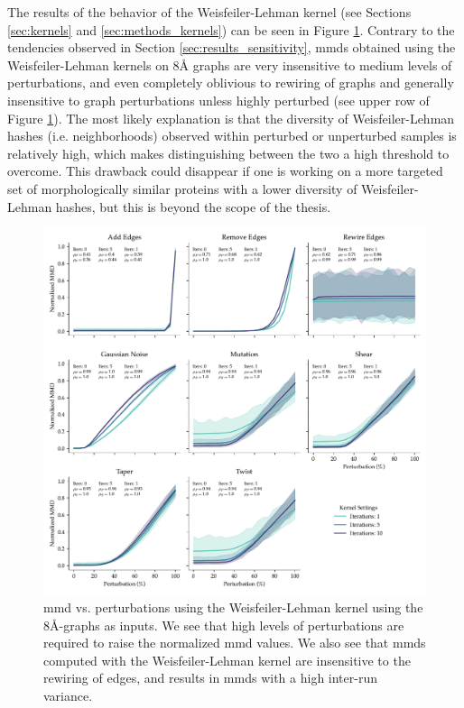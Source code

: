 The results of the behavior of the Weisfeiler-Lehman kernel (see Sections
\ref{sec:kernels} and \ref{sec:methods_kernels}) can be seen in Figure
\ref{fig:wlk}. Contrary to the tendencies observed in Section
\ref{sec:results_sensitivity}, \acrshort{mmd}s obtained using the Weisfeiler-Lehman
kernels on 8\si{\angstrom} graphs are very insensitive to medium levels of perturbations,
and even completely oblivious to rewiring of graphs and generally insensitive to
graph perturbations unless highly perturbed (see upper row of Figure \ref{fig:wlk}). The most likely explanation
is that the diversity of Weisfeiler-Lehman hashes (i.e. neighborhoods) observed within perturbed or
unperturbed samples is relatively high, which makes distinguishing between the
two a high threshold to overcome. This drawback could disappear if one is working on
a more targeted set of morphologically similar proteins with a lower diversity
of Weisfeiler-Lehman hashes, but this is beyond the scope of the thesis.

\begin{figure}
  \includegraphics[width=\textwidth]{./figures/results/res_3.pdf}
  \caption[Normalized \acrshort{mmd} values using the Weisfeiler-Lehman kernel subject to
  various perturbations.]{\acrshort{mmd} vs.
perturbations using the Weisfeiler-Lehman kernel using the
8\si{\angstrom}-graphs as inputs. We see that high levels of perturbations are
required to raise the normalized \acrshort{mmd} values. We also see that \acrshort{mmd}s computed with
the Weisfeiler-Lehman kernel are insensitive to the rewiring of edges, and
results in \acrshort{mmd}s with a high inter-run variance.}
  \label{fig:wlk}
\end{figure}


